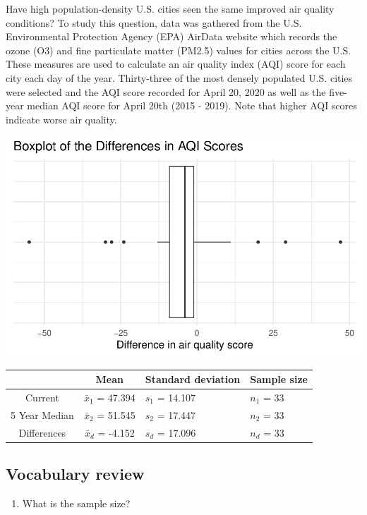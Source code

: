 \documentclass[
]{report}
\providecommand{\tightlist}{%
  \setlength{\itemsep}{0pt}\setlength{\parskip}{0pt}}
\begin{document}
Have high population-density U.S. cities seen the same improved air quality conditions? To study this question, data was gathered from the U.S. Environmental Protection Agency (EPA) AirData website which records the ozone (O3) and fine particulate matter (PM2.5) values for cities across the U.S. These measures are used to calculate an air quality index (AQI) score for each city each day of the year. Thirty-three of the most densely populated U.S. cities were selected and the AQI score recorded for April 20, 2020 as well as the five-year median AQI score for April 20th (2015 - 2019). Note that higher AQI scores indicate worse air quality.

\begin{center}\includegraphics[width=0.6\linewidth]{08-paired_files/figure-latex/unnamed-chunk-3-1} \end{center}

\begin{longtable}[]{@{}ccll@{}}
\toprule
& Mean & Standard deviation & Sample size\tabularnewline
\midrule
\endhead
Current & \(\bar{x}_1\) = 47.394 & \(s_1\) = 14.107 & \(n_1\) = 33\tabularnewline
5 Year Median & \(\bar{x}_2\) = 51.545 & \(s_2\) = 17.447 & \(n_2\) = 33\tabularnewline
Differences & \(\bar{x}_d\) = -4.152 & \(s_d\) = 17.096 & \(n_d\) = 33\tabularnewline
\bottomrule
\end{longtable}

\newpage

\hypertarget{vocabulary-review}{%
\subsection{Vocabulary review}\label{vocabulary-review}}

\begin{enumerate}
\def\labelenumi{\arabic{enumi}.}
\tightlist
\item
  What is the sample size?
\end{enumerate}

\vspace{0.5in}
\end{document}
